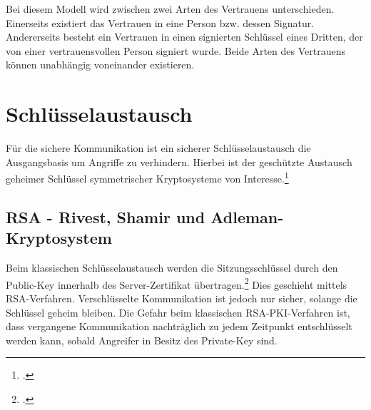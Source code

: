 \documentclass  [paper=a4,
				fontsize=12pt,
				listof=totoc,
				bibliography=totoc
				]{scrreprt}
\begin{document}
			Bei diesem Modell wird zwischen zwei Arten des Vertrauens unterschieden. Einerseits existiert das Vertrauen in eine Person bzw. dessen Signatur. Andererseits besteht ein Vertrauen in einen signierten Schlüssel eines Dritten, der von einer vertrauensvollen Person signiert wurde. Beide Arten des Vertrauens können unabhängig voneinander existieren.

		\section{Schlüsselaustausch}
			Für die sichere Kommunikation ist ein sicherer Schlüsselaustausch die Ausgangsbasis um Angriffe zu verhindern. \glqq Hierbei ist der geschützte Austausch geheimer Schlüssel symmetrischer Kryptosysteme von Interesse.\grqq\footcite[][S. 437]{Eckert2013}
			\subsection{RSA - Rivest, Shamir und Adleman-Kryptosystem} 
				Beim klassischen Schlüsselaustausch werden die Sitzungsschlüssel durch den Public-Key innerhalb des Server-Zertifikat übertragen.\footcite[Vgl.][]{Boeck2013} Dies geschieht mittels \ac{RSA}-Verfahren. Verschlüsselte Kommunikation ist jedoch nur sicher, solange die Schlüssel geheim bleiben. Die Gefahr beim klassischen \ac{RSA}-\ac{PKI}-Verfahren ist, dass vergangene Kommunikation nachträglich zu jedem Zeitpunkt entschlüsselt werden kann, sobald Angreifer in Besitz des Private-Key sind.\medskip\\
\end{document}
